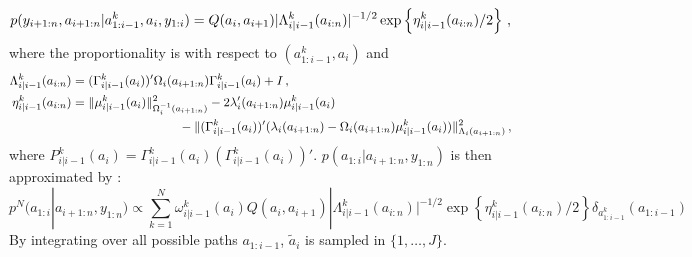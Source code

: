 \[
p(y_{i+1:n},a_{i+1:n}|a^k_{1:i-1},a_i,y_{1:i}) = Q(a_i,a_{i+1})|\Lambda^k_{i|i-1}(a_{i:n})|^{-1/2}\exp\left\{\eta^k_{i|i-1}(a_{i:n})/2\right\}\,,
\]
where the proportionality is with respect to $(a^k_{1:i-1},a_i)$ and
\begin{align*}
\Lambda^k_{i|i-1}(a_{i:n})&= (\Gamma_{i|i-1}^k(a_i))'\Omega_i(a_{i+1:n})\Gamma_{i|i-1}^k(a_i) + I\eqsp,\\
\eta^k_{i|i-1}(a_{i:n}) &= \|\mu_{i|i-1}^k(a_i)\|^2_{\Omega^{-1}_i(a_{i+1:n})} - 2\lambda'_i(a_{i+1:n})\mu_{i|i-1}^k(a_i)\\
&\hspace{3cm}-\|(\Gamma_{i|i-1}^k(a_i))'(\lambda_i(a_{i+1:n})-\Omega_i(a_{i+1:n})\mu_{i|i-1}^k(a_i))\|^2_{\Lambda_i(a_{i+1:n})}\eqsp,
\end{align*}
where $P_{i|i-1}^k(a_i) = \Gamma_{i|i-1}^k(a_i)(\Gamma_{i|i-1}^k(a_i))'$. $p(a_{1:i}|a_{i+1:n},y_{1:n})$ is then approximated by :
\[
p^N(a_{1:i}|a_{i+1:n},y_{1:n})\propto\sum_{k=1}^N \omega_{i|i-1}^k(a_i)Q(a_i,a_{i+1})|\Lambda^k_{i|i-1}(a_{i:n})|^{-1/2}\exp\left\{\eta^k_{i|i-1}(a_{i:n})/2\right\}\delta_{a^k_{1:i-1}}(a_{1:i-1})
\]
By integrating over all possible paths $a_{1:i-1}$, $\tilde{a}_i$ is sampled in $\{1,\ldots,J\}$.
